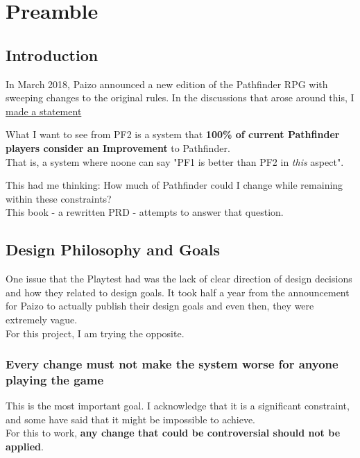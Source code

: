 \chapter*{Preamble}
\section{Introduction}

In March 2018, Paizo announced a new edition of the Pathfinder RPG with sweeping changes
to the original rules. In the discussions that arose around this, I 
\href{https://paizo.com/threads/rzs2v5kr&page=2?Main-Thing-You-Want-From-PF2#82}{made a statement}

\begin{formal}
 What I want to see from PF2 is a system that \textbf{100\% of current Pathfinder players consider an Improvement} to Pathfinder. \\
 That is, a system where noone can say "PF1 is better than PF2 in \textit{this} aspect".
\end{formal}

This had me thinking: How much of Pathfinder could I change while remaining within these constraints? \\

This book - a rewritten PRD - attempts to answer that question.

\section{Design Philosophy and Goals}
One issue that the Playtest had was the lack of clear direction of design decisions and how they related
to design goals. It took half a year from the announcement for Paizo to actually publish their design
goals and even then, they were extremely vague. \\

For this project, I am trying the opposite. \\

\subsection{Every change must not make the system worse for anyone playing the game}

This is the most important goal. I acknowledge that it is a significant constraint, and some have said
that it might be impossible to achieve. \\

For this to work, \textbf{any change that could be controversial should not be applied}. \\

